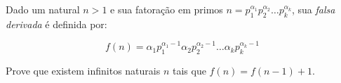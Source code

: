 Dado um natural $n>1$ e sua fatoração em primos $n=p_1^{\alpha_1}p_2^{\alpha_2}\dots p_k^{\alpha_k}$, sua \textit{falsa derivada} é definida por:

$$f(n) = \alpha_1p_1^{\alpha_1-1}\alpha_2p_2^{\alpha_2-1}\dots \alpha_kp_k^{\alpha_k-1}$$

Prove que existem infinitos naturais $n$ tais que $f(n) = f(n-1) + 1$.